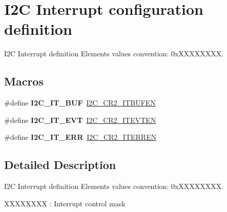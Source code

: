 \hypertarget{group___i2_c___interrupt__configuration__definition}{\section{I2\-C Interrupt configuration definition}
\label{group___i2_c___interrupt__configuration__definition}
}


I2\-C Interrupt definition Elements values convention\-: 0x\-X\-X\-X\-X\-X\-X\-X\-X.  


\subsection*{Macros}
\begin{DoxyCompactItemize}
\item 
\hypertarget{group___i2_c___interrupt__configuration__definition_gad3ff3f405b882aa4d2f91310aa1cc0df}{\#define {\bfseries I2\-C\-\_\-\-I\-T\-\_\-\-B\-U\-F}~\hyperlink{group___peripheral___registers___bits___definition_ga2efbe5d96ed0ce447a45a62e8317a68a}{I2\-C\-\_\-\-C\-R2\-\_\-\-I\-T\-B\-U\-F\-E\-N}}\label{group___i2_c___interrupt__configuration__definition_gad3ff3f405b882aa4d2f91310aa1cc0df}

\item 
\hypertarget{group___i2_c___interrupt__configuration__definition_gadd59efa313e1598a084a1e5ec3905b02}{\#define {\bfseries I2\-C\-\_\-\-I\-T\-\_\-\-E\-V\-T}~\hyperlink{group___peripheral___registers___bits___definition_ga3b1ebaf8173090ec469b055b98e585d2}{I2\-C\-\_\-\-C\-R2\-\_\-\-I\-T\-E\-V\-T\-E\-N}}\label{group___i2_c___interrupt__configuration__definition_gadd59efa313e1598a084a1e5ec3905b02}

\item 
\hypertarget{group___i2_c___interrupt__configuration__definition_gadba3667b439cbf4ba1e6e9aec961ab03}{\#define {\bfseries I2\-C\-\_\-\-I\-T\-\_\-\-E\-R\-R}~\hyperlink{group___peripheral___registers___bits___definition_ga6f14ae48e4609c2b3645211234cba974}{I2\-C\-\_\-\-C\-R2\-\_\-\-I\-T\-E\-R\-R\-E\-N}}\label{group___i2_c___interrupt__configuration__definition_gadba3667b439cbf4ba1e6e9aec961ab03}

\end{DoxyCompactItemize}


\subsection{Detailed Description}
I2\-C Interrupt definition Elements values convention\-: 0x\-X\-X\-X\-X\-X\-X\-X\-X. 
\begin{DoxyItemize}
\item X\-X\-X\-X\-X\-X\-X\-X \-: Interrupt control mask 
\end{DoxyItemize}